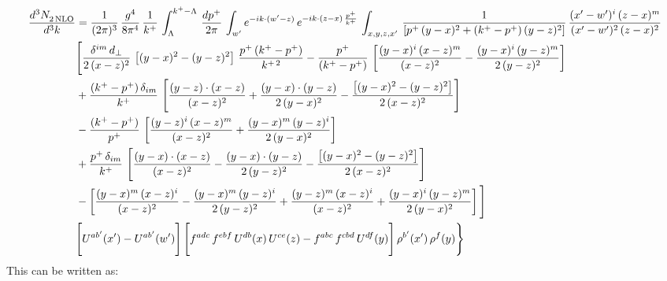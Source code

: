 \documentclass[9pt]{article}
\numberwithin{equation}{section}
\begin{document}
\begin{align}
    \frac{d^{3}N_{2\,\rm NLO}^{\rm}}{d^{3}k}  & =  \frac{1}{(2\pi)^{3}}\,\frac{g^{4}}{8\pi^{4}}\,\frac{1}{k^{+}}\,\int_{\Lambda}^{k^{+}-\Lambda}\, \frac{dp^{+}}{2\pi} \,\int_{ w^\prime} e^{-ik\cdot(w'-z)}\,e^{-ik\cdot (z-x)\,\frac{p^{+}}{k^{+}}}\, \int_{x,y,z,x'}\,\frac{1}{\left[p^{+}\,(y-x)^{2}+(k^{+}-p^{+})\,(y-z)^{2}\right]}\, \frac{(x'-w')^{i}\,(z-x)^{m}}{(x'-w')^{2}\,(z-x)^{2}} \notag \\ & \Bigg[\frac{\delta^{im}\,d_{\perp}}{2\,(x-z)^{2}}\,\left[(y-x)^{2}-(y-z)^{2}\right]\,\frac{p^{+}\,(k^{+}-p^{+})}{k^{+\,2}}-\frac{p^{+}}{(k^{+}-p^{+})}\,\left[\frac{(y-x)^{i}\,(x-z)^{m}}{(x-z)^{2}}-\frac{(y-x)^{i}\,(y-z)^{m}}{2\,(y-z)^{2}}\right]\notag \\ & +\frac{(k^{+}-p^{+})\,\delta_{im}}{k^{+}}\,\left[\frac{(y-z)\cdot (x-z)}{(x-z)^{2}}+\frac{(y-x)\cdot (y-z)}{2\,(y-x)^{2}}-\frac{\left[(y-x)^{2}-(y-z)^{2}\right]}{2\,(x-z)^{2}}\right]\notag \\ & -\frac{(k^{+}-p^{+})}{p^{+}}\,\left[\frac{(y-z)^{i}\,(x-z)^{m}}{(x-z)^{2}}+\frac{(y-x)^{m}\,(y-z)^{i}}{2\,(y-x)^{2}}\right]\notag \\ & +\frac{p^{+}\,\delta_{im}}{k^{+}}\,\left[\frac{(y-x)\cdot (x-z)}{(x-z)^{2}}-\frac{(y-x)\cdot (y-z)}{2\,(y-z)^{2}}-\frac{\left[(y-x)^{2}-(y-z)^{2}\right]}{2\,(x-z)^{2}}\right]\notag \\ &-\left[\frac{(y-x)^{m}\,(x-z)^{i}}{(x-z)^{2}}-\frac{(y-x)^{m}\,(y-z)^{i}}{2\,(y-z)^{2}}+\frac{(y-z)^{m}\,(x-z)^{i}}{(x-z)^{2}}+\frac{(y-x)^{i}\,(y-z)^{m}}{2\,(y-x)^{2}}\right]\Bigg] \notag \\ & \Bigg[U^{ab'}(x')-U^{ab'}(w')\Bigg]\,\Bigg[f^{adc}\,f^{ebf}\,U^{db}(x)\,U^{ce}(z)-f^{abc}\,f^{cbd}\,U^{df}(y)\Bigg]\,\rho^{b'}(x')\,\rho^{f}(y)\Bigg\}
\end{align}
This can be written as: 
\end{document}
